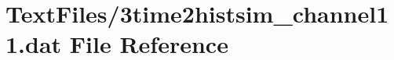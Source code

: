 \hypertarget{3time2histsim__channel11_8dat}{}\section{Text\+Files/3time2histsim\+\_\+channel11.dat File Reference}
\label{3time2histsim__channel11_8dat}
